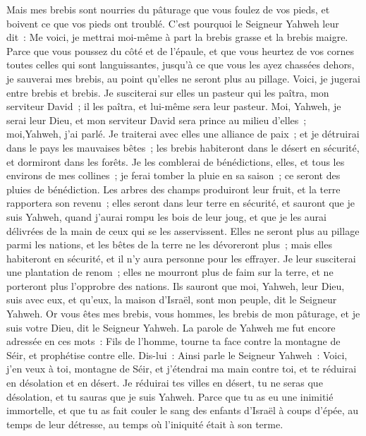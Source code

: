 \begin{multicols}{2}
Mais mes brebis sont nourries du pâturage que vous foulez de vos pieds, et boivent ce que vos pieds ont troublé.
C'est pourquoi le Seigneur Yahweh leur dit~: Me voici, je mettrai moi-même à part la brebis grasse et la brebis maigre.
Parce que vous poussez du côté et de l'épaule, et que vous heurtez de vos cornes toutes celles qui sont languissantes, jusqu'à ce que vous les ayez chassées dehors,
je sauverai mes brebis, au point qu'elles ne seront plus au pillage. Voici, je jugerai entre brebis et brebis.
Je susciterai sur elles un pasteur qui les paîtra, mon serviteur David~; il les paîtra, et lui-même sera leur pasteur.
Moi, Yahweh, je serai leur Dieu, et mon serviteur David sera prince au milieu d'elles~; moi,Yahweh, j'ai parlé.
Je traiterai avec elles une alliance de paix~; et je détruirai dans le pays les mauvaises bêtes~; les brebis habiteront dans le désert en sécurité, et dormiront dans les forêts.
Je les comblerai de bénédictions, elles, et tous les environs de mes collines~; je ferai tomber la pluie en sa saison~; ce seront des pluies de bénédiction.
Les arbres des champs produiront leur fruit, et la terre rapportera son revenu~; elles seront dans leur terre en sécurité, et sauront que je suis Yahweh, quand j'aurai rompu les bois de leur joug, et que je les aurai délivrées de la main de ceux qui se les asservissent.
Elles ne seront plus au pillage parmi les nations, et les bêtes de la terre ne les dévoreront plus~; mais elles habiteront en sécurité, et il n'y aura personne pour les effrayer.
Je leur susciterai une plantation de renom~; elles ne mourront plus de faim sur la terre, et ne porteront plus l'opprobre des nations.
Ils sauront que moi, Yahweh, leur Dieu, suis avec eux, et qu'eux, la maison d'Israël, sont mon peuple, dit le Seigneur Yahweh.
Or vous êtes mes brebis, vous hommes, les brebis de mon pâturage, et je suis votre Dieu, dit le Seigneur Yahweh.
\VerseOne{}La parole de Yahweh me fut encore adressée en ces mots~:
Fils de l'homme, tourne ta face contre la montagne de Séir, et prophétise contre elle.
Dis-lui~: Ainsi parle le Seigneur Yahweh~: Voici, j'en veux à toi, montagne de Séir, et j'étendrai ma main contre toi, et te réduirai en désolation et en désert.
Je réduirai tes villes en désert, tu ne seras que désolation, et tu sauras que je suis Yahweh.
Parce que tu as eu une inimitié immortelle, et que tu as fait couler le sang des enfants d'Israël à coups d'épée, au temps de leur détresse, au temps où l'iniquité était à son terme.

\end{multicols}
